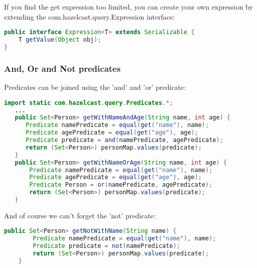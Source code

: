 If you find the get expression too limited, you can create your own expression by extending the com.hazelcast.query.Expression interface:
\begin{lstlisting}[language=java]
public interface Expression<T> extends Serializable {
    T getValue(Object obj);
}
\end{lstlisting}

\subsubsection*{And, Or and Not predicates}
Predicates can be joined using the 'and' and 'or' predicate:
\begin{lstlisting}[language=java]
import static com.hazelcast.query.Predicates.*;
   ...
   public Set<Person> getWithNameAndAge(String name, int age) {
      Predicate namePredicate = equal(get("name"), name);
      Predicate agePredicate = equal(get("age"), age);
      Predicate predicate = and(namePredicate, agePredicate);
      return (Set<Person>) personMap.values(predicate);
   }
   public Set<Person> getWithNameOrAge(String name, int age) {
       Predicate namePredicate = equal(get("name"), name);
       Predicate agePredicate = equal(get("age"), age);
       Predicate Person = or(namePredicate, agePredicate);
       return (Set<Person>) personMap.values(predicate);
   }
\end{lstlisting}
And of course we can't forget the 'not' predicate:
\begin{lstlisting}[language=java]
    public Set<Person> getNotWithName(String name) {
        Predicate namePredicate = equal(get("name"), name);
        Predicate predicate = not(namePredicate);
        return (Set<Person>) personMap.values(predicate);
    }
\end{lstlisting}

